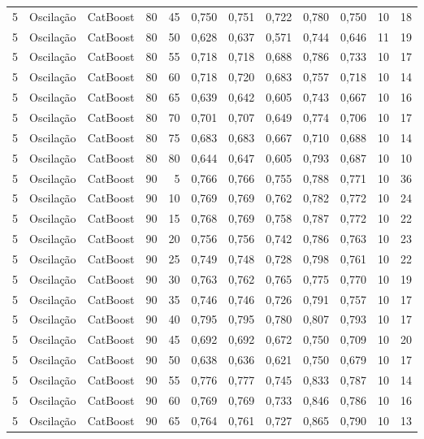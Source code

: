 \begin{longtable}{@{}rllrrrrrrrrr@{}}
5 & Oscilação & CatBoost & 80 & 45 & 0,750 & 0,751 & 0,722 & 0,780 & 0,750 & 10 & 18 \\
5 & Oscilação & CatBoost & 80 & 50 & 0,628 & 0,637 & 0,571 & 0,744 & 0,646 & 11 & 19 \\
5 & Oscilação & CatBoost & 80 & 55 & 0,718 & 0,718 & 0,688 & 0,786 & 0,733 & 10 & 17 \\
5 & Oscilação & CatBoost & 80 & 60 & 0,718 & 0,720 & 0,683 & 0,757 & 0,718 & 10 & 14 \\
5 & Oscilação & CatBoost & 80 & 65 & 0,639 & 0,642 & 0,605 & 0,743 & 0,667 & 10 & 16 \\
5 & Oscilação & CatBoost & 80 & 70 & 0,701 & 0,707 & 0,649 & 0,774 & 0,706 & 10 & 17 \\
5 & Oscilação & CatBoost & 80 & 75 & 0,683 & 0,683 & 0,667 & 0,710 & 0,688 & 10 & 14 \\
5 & Oscilação & CatBoost & 80 & 80 & 0,644 & 0,647 & 0,605 & 0,793 & 0,687 & 10 & 10 \\
5 & Oscilação & CatBoost & 90 & 5 & 0,766 & 0,766 & 0,755 & 0,788 & 0,771 & 10 & 36 \\
5 & Oscilação & CatBoost & 90 & 10 & 0,769 & 0,769 & 0,762 & 0,782 & 0,772 & 10 & 24 \\
5 & Oscilação & CatBoost & 90 & 15 & 0,768 & 0,769 & 0,758 & 0,787 & 0,772 & 10 & 22 \\
5 & Oscilação & CatBoost & 90 & 20 & 0,756 & 0,756 & 0,742 & 0,786 & 0,763 & 10 & 23 \\
5 & Oscilação & CatBoost & 90 & 25 & 0,749 & 0,748 & 0,728 & 0,798 & 0,761 & 10 & 22 \\
5 & Oscilação & CatBoost & 90 & 30 & 0,763 & 0,762 & 0,765 & 0,775 & 0,770 & 10 & 19 \\
5 & Oscilação & CatBoost & 90 & 35 & 0,746 & 0,746 & 0,726 & 0,791 & 0,757 & 10 & 17 \\
5 & Oscilação & CatBoost & 90 & 40 & 0,795 & 0,795 & 0,780 & 0,807 & 0,793 & 10 & 17 \\
5 & Oscilação & CatBoost & 90 & 45 & 0,692 & 0,692 & 0,672 & 0,750 & 0,709 & 10 & 20 \\
5 & Oscilação & CatBoost & 90 & 50 & 0,638 & 0,636 & 0,621 & 0,750 & 0,679 & 10 & 17 \\
5 & Oscilação & CatBoost & 90 & 55 & 0,776 & 0,777 & 0,745 & 0,833 & 0,787 & 10 & 14 \\
5 & Oscilação & CatBoost & 90 & 60 & 0,769 & 0,769 & 0,733 & 0,846 & 0,786 & 10 & 16 \\
5 & Oscilação & CatBoost & 90 & 65 & 0,764 & 0,761 & 0,727 & 0,865 & 0,790 & 10 & 13 \\

\end{longtable}
